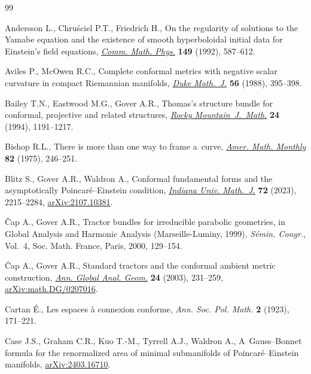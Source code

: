 \documentclass[pdftex]{sigma}
\numberwithin{equation}{section}
\renewcommand{\=}{\stackrel \Lambda =}
\begin{document}
\begin{thebibliography}{99}
\footnotesize\itemsep=0pt

Andersson L., Chru\'sciel P.T., Friedrich H., On the regularity of solutions to
 the {Y}amabe equation and the existence of smooth hyperboloidal initial data
 for {E}instein's field equations, \href{https://doi.org/10.1007/BF02096944}{\textit{Comm. Math. Phys.}} \textbf{149}
 (1992), 587--612.

Aviles P., McOwen R.C., Complete conformal metrics with negative scalar
 curvature in compact {R}iemannian manifolds, \href{https://doi.org/10.1215/S0012-7094-88-05616-5}{\textit{Duke Math.~J.}}
 \textbf{56} (1988), 395--398.

Bailey T.N., Eastwood M.G., Gover A.R., Thomas's structure bundle for
 conformal, projective and related structures, \href{https://doi.org/10.1216/rmjm/1181072333}{\textit{Rocky
 Mountain~J.~Math.}} \textbf{24} (1994), 1191--1217.

Bishop R.L., There is more than one way to frame a~curve, \href{https://doi.org/10.2307/2319846}{\textit{Amer. Math.
 Monthly}} \textbf{82} (1975), 246--251.

Blitz S., Gover A.R., Waldron A., Conformal fundamental forms and the
 asymptotically {P}oincar\'e--{E}instein condition, \href{https://doi.org/10.1512/iumj.2023.72.9518}{\textit{Indiana Univ.
 Math.~J.}} \textbf{72} (2023), 2215--2284, \href{https://arxiv.org/abs/2107.10381}{arXiv:2107.10381}.

{\v{C}}ap A., Gover A.R., Tractor bundles for irreducible parabolic geometries,
 in Global Analysis and Harmonic Analysis ({M}arseille-{L}uminy, 1999),
 \textit{S\'emin. Congr.}, Vol.~4, Soc. Math. France, Paris, 2000, 129--154.

{\v{C}}ap A., Gover A.R., Standard tractors and the conformal ambient metric
 construction, \href{https://doi.org/10.1023/A:1024726607595}{\textit{Ann. Global Anal. Geom.}} \textbf{24} (2003), 231--259,
 \href{https://arxiv.org/abs/math.DG/0207016}{arXiv:math.DG/0207016}.

Cartan {\'E}., Les espaces \`a connexion conforme, \textit{Ann. Soc. Pol.
 Math.} \textbf{2} (1923), 171--221.

Case J.S., Graham C.R., Kuo T.-M., Tyrrell A.J., Waldron A., A~{G}auss--{B}onnet
 formula for the renormalized area of minimal submanifolds of
 {P}oincar\'e--{E}instein manifolds, \href{https://arxiv.org/abs/2403.16710}{arXiv:2403.16710}.


\end{thebibliography}
\end{document}
